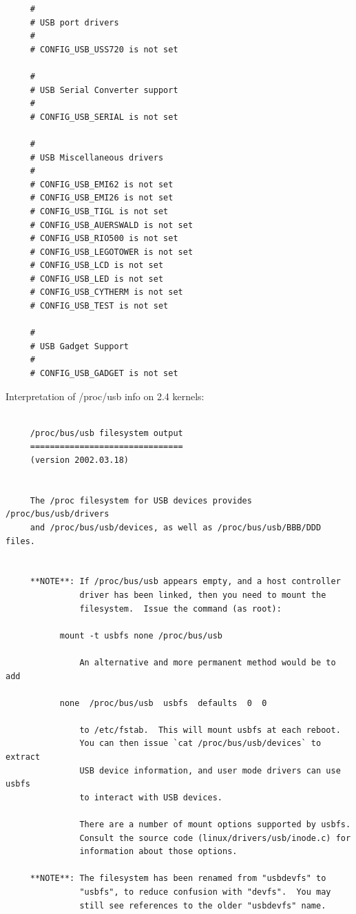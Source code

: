 {{{{{{{{{{{{{{{{{\begin{verbatim}
     #
     # USB port drivers
     #
     # CONFIG_USB_USS720 is not set
     
     #
     # USB Serial Converter support
     #
     # CONFIG_USB_SERIAL is not set
     
     #
     # USB Miscellaneous drivers
     #
     # CONFIG_USB_EMI62 is not set
     # CONFIG_USB_EMI26 is not set
     # CONFIG_USB_TIGL is not set
     # CONFIG_USB_AUERSWALD is not set
     # CONFIG_USB_RIO500 is not set
     # CONFIG_USB_LEGOTOWER is not set
     # CONFIG_USB_LCD is not set
     # CONFIG_USB_LED is not set
     # CONFIG_USB_CYTHERM is not set
     # CONFIG_USB_TEST is not set
     
     #
     # USB Gadget Support
     #
     # CONFIG_USB_GADGET is not set
\end{verbatim}
\normalsize

Interpretation of /proc/usb info on 2.4 kernels: 

\footnotesize
\begin{verbatim}
     
     /proc/bus/usb filesystem output
     ===============================
     (version 2002.03.18)
     
     
     The /proc filesystem for USB devices provides /proc/bus/usb/drivers
     and /proc/bus/usb/devices, as well as /proc/bus/usb/BBB/DDD files.
     
     
     **NOTE**: If /proc/bus/usb appears empty, and a host controller
               driver has been linked, then you need to mount the
               filesystem.  Issue the command (as root):
     
           mount -t usbfs none /proc/bus/usb
     
               An alternative and more permanent method would be to add
     
           none  /proc/bus/usb  usbfs  defaults  0  0
     
               to /etc/fstab.  This will mount usbfs at each reboot.
               You can then issue `cat /proc/bus/usb/devices` to extract
               USB device information, and user mode drivers can use usbfs
               to interact with USB devices.
     
               There are a number of mount options supported by usbfs.
               Consult the source code (linux/drivers/usb/inode.c) for
               information about those options.
     
     **NOTE**: The filesystem has been renamed from "usbdevfs" to
               "usbfs", to reduce confusion with "devfs".  You may
               still see references to the older "usbdevfs" name.
     

\end{verbatim}}}}}}}}}}}}}}}}}}

